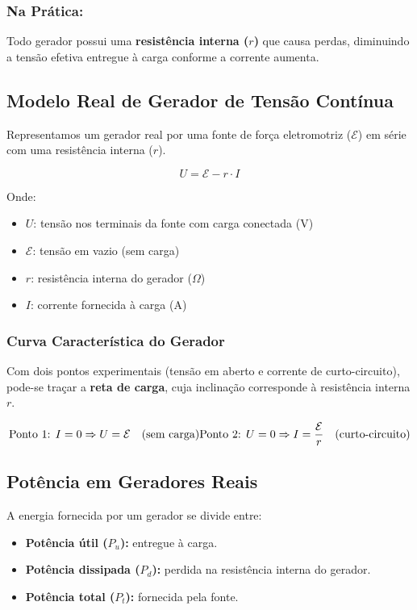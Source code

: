 \subsubsection{Na Prática:}
Todo gerador possui uma \textbf{resistência interna ($r$)} que causa perdas, diminuindo a tensão efetiva entregue à carga conforme a corrente aumenta.

\subsection{Modelo Real de Gerador de Tensão Contínua}
Representamos um gerador real por uma fonte de força eletromotriz ($\mathcal{E}$) em série com uma resistência interna ($r$).

\[
U = \mathcal{E} - r \cdot I
\]

Onde:
\begin{itemize}
    \item $U$: tensão nos terminais da fonte com carga conectada (V)
    \item $\mathcal{E}$: tensão em vazio (sem carga)
    \item $r$: resistência interna do gerador ($\Omega$)
    \item $I$: corrente fornecida à carga (A)
\end{itemize}

\subsubsection{Curva Característica do Gerador}
Com dois pontos experimentais (tensão em aberto e corrente de curto-circuito), pode-se traçar a \textbf{reta de carga}, cuja inclinação corresponde à resistência interna $r$.

\[
\text{Ponto 1: } I = 0 \Rightarrow U = \mathcal{E} \quad \text{(sem carga)}\\
\text{Ponto 2: } U = 0 \Rightarrow I = \frac{\mathcal{E}}{r} \quad \text{(curto-circuito)}
\]

\subsection{Potência em Geradores Reais}
A energia fornecida por um gerador se divide entre:

\begin{itemize}
    \item \textbf{Potência útil ($P_u$):} entregue à carga.
    \item \textbf{Potência dissipada ($P_d$):} perdida na resistência interna do gerador.
    \item \textbf{Potência total ($P_t$):} fornecida pela fonte.
\end{itemize}


